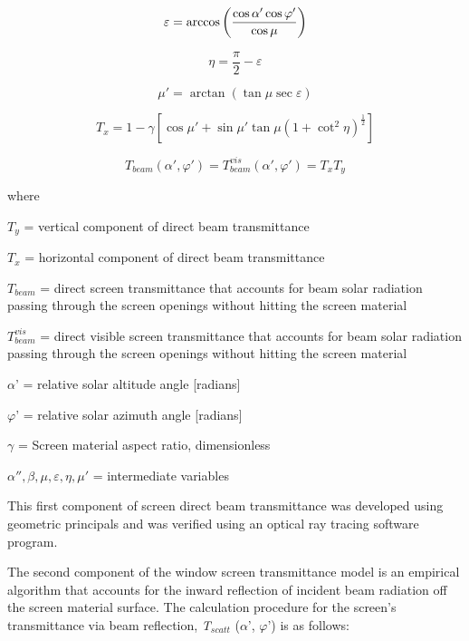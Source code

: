 \begin{equation}
  \varepsilon  = \arccos \PB{\frac{\cos \alpha '\cos \varphi '}{\cos \mu}}
\end{equation}

\begin{equation}
\eta  = \frac{\pi }{2} - \varepsilon
\end{equation}

\begin{equation}
\mu ' = \arctan \left( {\tan \mu \sec \varepsilon } \right)
\end{equation}

\begin{equation}
{T_x} = 1 - \gamma \left[ {\cos \mu ' + \sin \mu '\tan \mu {{\left( {1 + {{\cot }^2}\eta } \right)}^{\frac{1}{2}}}} \right]
\end{equation}

\begin{equation}
{T_{beam}}\left( {\alpha ',\varphi '} \right) = T_{beam}^{vis}\left( {\alpha ',\varphi '} \right) = {T_x}{T_y}
\end{equation}

where

\({T_y}\) = vertical component of direct beam transmittance

\({T_x}\) = horizontal component of direct beam transmittance

\({T_{beam}}\) = direct screen transmittance that accounts for beam solar radiation passing through the screen openings without hitting the screen material

\(T_{beam}^{vis}\) = direct visible screen transmittance that accounts for beam solar radiation passing through the screen openings without hitting the screen material

\(\alpha\)' = relative solar altitude angle {[}radians{]}

\(\varphi\)' = relative solar azimuth angle {[}radians{]}

\(\gamma\) = Screen material aspect ratio, dimensionless

\(\alpha '',\beta ,\mu ,\varepsilon ,\eta ,\mu '\) = intermediate variables

This first component of screen direct beam transmittance was developed using geometric principals and was verified using an optical ray tracing software program.

The second component of the window screen transmittance model is an empirical algorithm that accounts for the inward reflection of incident beam radiation off the screen material surface. The calculation procedure for the screen's transmittance via beam reflection, \emph{T\(_{scatt}\)} (\(\alpha\)', \(\varphi\)') is as follows:

